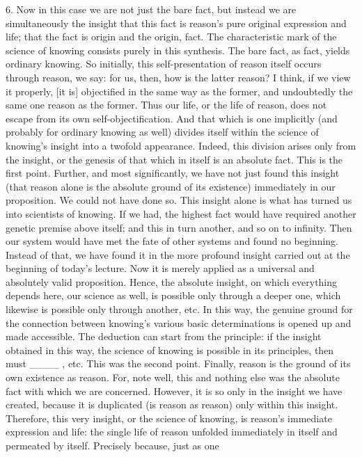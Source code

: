 6. Now in this case we are not just the bare fact,
but instead we are simultaneously
the insight that this fact is
reason's pure original expression and life;
that the fact is origin and the origin, fact.
The characteristic mark of the science of knowing
consists purely in this synthesis.
The bare fact, as fact, yields ordinary knowing.
So initially, this self-presentation of reason
itself occurs through reason, we say:
for us, then, how is the latter reason?
I think, if we view it properly,
[it is] objectified in the same way as the former,
and undoubtedly the same one reason as the former.
Thus our life, or the life of reason,
does not escape from its own self-objectification.
And that which is one implicitly
(and probably for ordinary knowing as well)
divides itself within the science of knowing's
insight into a twofold appearance.
Indeed, this division arises only from the insight,
or the genesis of that which in itself is an absolute fact.
This is the first point.
Further, and most significantly,
we have not just found this insight
(that reason alone is the absolute ground of its existence)
immediately in our proposition.
We could not have done so.
This insight alone is what has
turned us into scientists of knowing.
If we had, the highest fact would have required
another genetic premise above itself;
and this in turn another, and so on to infinity.
Then our system would have met the fate
of other systems and found no beginning.
Instead of that, we have found it
in the more profound insight
carried out at the beginning of today's lecture.
Now it is merely applied as
a universal and absolutely valid proposition.
Hence, the absolute insight,
on which everything depends here,
our science as well, is possible only through a deeper one,
which likewise is possible only through another, etc.
In this way, the genuine ground for the connection
between knowing's various basic determinations is
opened up and made accessible.
The deduction can start from the principle:
if the insight obtained in this way,
the science of knowing is possible in its principles,
then must ____ , etc.
This was the second point.
Finally, reason is the ground of its own existence as reason.
For, note well, this and nothing else was
the absolute fact with which we are concerned.
However, it is so only in the insight we have created,
because it is duplicated (is reason as reason)
only within this insight.
Therefore, this very insight,
or the science of knowing, is
reason's immediate expression and life:
the single life of reason unfolded
immediately in itself and permeated by itself.
Precisely because, just as one
